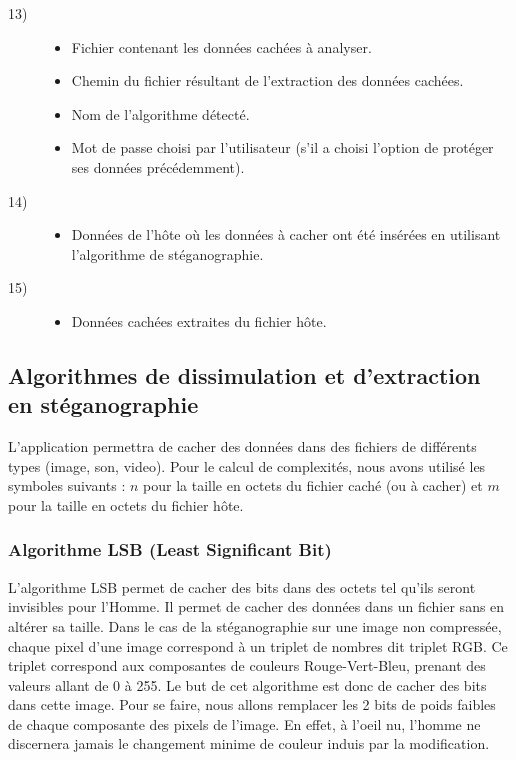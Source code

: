 \documentclass[11pt]{article}
\begin{document}
\begin{description}
\item[13)]
\begin{itemize}
\item Fichier contenant les données cachées à analyser.
\item Chemin du fichier résultant de l'extraction des données cachées.
\item Nom de l'algorithme détecté.
\item Mot de passe choisi par l'utilisateur (s'il a choisi l'option de protéger
    ses données précédemment).
\end{itemize}
\item[14)]
\begin{itemize}
\item Données de l'hôte où les données à cacher ont été insérées en utilisant
    l'algorithme de stéganographie.
\end{itemize}
\item[15)]
\begin{itemize}
\item Données cachées extraites du fichier hôte.
\end{itemize}
\end{description}

\small
\subsection{Algorithmes de dissimulation et d'extraction en stéganographie}

L'application permettra de cacher des données dans des fichiers de différents
types (image, son, video). Pour le calcul de complexités, nous avons utilisé les symboles suivants : 
$n$ pour la taille en octets du fichier caché (ou à cacher) et $m$ pour la taille en octets du fichier hôte. 

\subsubsection{Algorithme LSB (Least Significant Bit)}

L'algorithme LSB permet de cacher des bits dans des octets tel qu'ils seront
invisibles pour l'Homme. Il permet de cacher des données dans un fichier sans en
altérer sa taille. Dans le cas de la stéganographie sur une image non compressée,
chaque pixel d'une image correspond à un triplet de nombres dit triplet RGB. Ce
triplet correspond aux composantes de couleurs Rouge-Vert-Bleu, prenant des
valeurs allant de 0 à 255. Le but de cet algorithme est donc de cacher des bits 
dans cette image. Pour se faire, nous allons remplacer les 2 bits de poids 
faibles de chaque composante des pixels de l'image. En effet, à l'oeil nu, 
l'homme ne discernera jamais le changement minime de couleur induis par la 
modification. 
\end{document}
